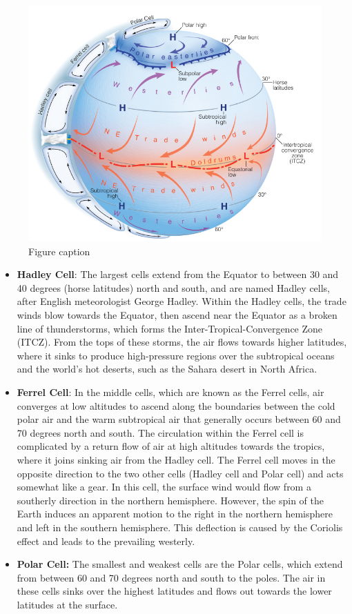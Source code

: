 \documentclass[12pt,oneside]{book}
\providecommand{\tightlist}{%
  \setlength{\itemsep}{0pt}\setlength{\parskip}{0pt}}
\begin{document}
\begin{figure}

{\centering \includegraphics[width=0.8\linewidth]{figures/Figure512} 

}

\caption{Figure caption}\label{fig:Fig512}
\end{figure}

\begin{itemize}
\tightlist
\item
  \textbf{Hadley Cell}: The largest cells extend from the Equator to
  between 30 and 40 degrees (horse latitudes) north and south, and are
  named Hadley cells, after English meteorologist George Hadley. Within
  the Hadley cells, the trade winds blow towards the Equator, then
  ascend near the Equator as a broken line of thunderstorms, which forms
  the Inter-Tropical-Convergence Zone (ITCZ). From the tops of these
  storms, the air flows towards higher latitudes, where it sinks to
  produce high-pressure regions over the subtropical oceans and the
  world's hot deserts, such as the Sahara desert in North Africa.
\item
  \textbf{Ferrel Cell}: In the middle cells, which are known as the
  Ferrel cells, air converges at low altitudes to ascend along the
  boundaries between the cold polar air and the warm subtropical air
  that generally occurs between 60 and 70 degrees north and south. The
  circulation within the Ferrel cell is complicated by a return flow of
  air at high altitudes towards the tropics, where it joins sinking air
  from the Hadley cell. The Ferrel cell moves in the opposite direction
  to the two other cells (Hadley cell and Polar cell) and acts somewhat
  like a gear. In this cell, the surface wind would flow from a
  southerly direction in the northern hemisphere. However, the spin of
  the Earth induces an apparent motion to the right in the northern
  hemisphere and left in the southern hemisphere. This deflection is
  caused by the Coriolis effect and leads to the prevailing westerly.
\item
  \textbf{Polar Cell:} The smallest and weakest cells are the Polar
  cells, which extend from between 60 and 70 degrees north and south to
  the poles. The air in these cells sinks over the highest latitudes and
  flows out towards the lower latitudes at the surface.
\end{itemize}
\end{document}
